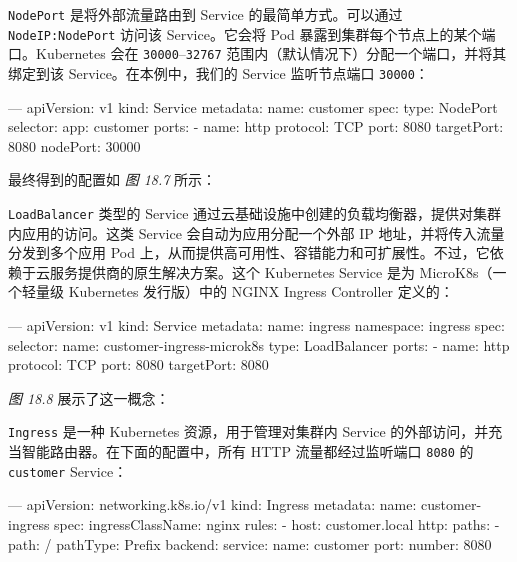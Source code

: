 \label{idx:1981}
\texttt{NodePort} 是将外部流量路由到 Service 的最简单方式。可以通过 \texttt{Node\allowbreak{}IP:Node\allowbreak{}Port} 访问该 Service。它会将 Pod 暴露到集群每个节点上的某个端口。Kubernetes 会在 \texttt{30000}–\texttt{32767} 范围内（默认情况下）分配一个端口，并将其绑定到该 Service。在本例中，我们的 Service 监听节点端口 \texttt{30000}：

\begin{codebox}[yaml]
---
apiVersion: v1
kind: Service
metadata:
  name: customer
spec:
  type: NodePort
  selector:
    app: customer
  ports:
    - name: http
      protocol: TCP
      port: 8080
      targetPort: 8080
      nodePort: 30000
\end{codebox}

\label{idx:1982}
最终得到的配置如 \emph{图 18.7} 所示：


\label{idx:1983}
\texttt{Load\allowbreak{}Balancer} 类型的 Service 通过云基础设施中创建的负载均衡器，提供对集群内应用的访问。这类 Service 会自动为应用分配一个外部 IP 地址，并将传入流量分发到多个应用 Pod 上，从而提供高可用性、容错能力和可扩展性。不过，它依赖于云服务提供商的原生解决方案。这个 Kubernetes Service 是为 MicroK8s（一个轻量级 Kubernetes 发行版）中的 NGINX Ingress Controller 定义的：

\begin{codebox}[yaml]
---
apiVersion: v1
kind: Service
metadata:
  name: ingress
  namespace: ingress
spec:
  selector:
    name: customer-ingress-microk8s
  type: LoadBalancer
  ports:
    - name: http
      protocol: TCP
      port: 8080
      targetPort: 8080
\end{codebox}

\emph{图 18.8} 展示了这一概念：


\label{idx:1984}
\texttt{Ingress} 是一种 Kubernetes 资源，用于管理对集群内 Service 的外部访问，并充当智能路由器。在下面的配置中，所有 HTTP 流量都经过监听端口 \texttt{8080} 的 \texttt{customer} Service：

\begin{codebox}[yaml]
---
apiVersion: networking.k8s.io/v1
kind: Ingress
metadata:
  name: customer-ingress
spec:
  ingressClassName: nginx
  rules:
    - host: customer.local
      http:
        paths:
          - path: /
            pathType: Prefix
            backend:
              service:
                name: customer
                port:
                  number: 8080
\end{codebox}

